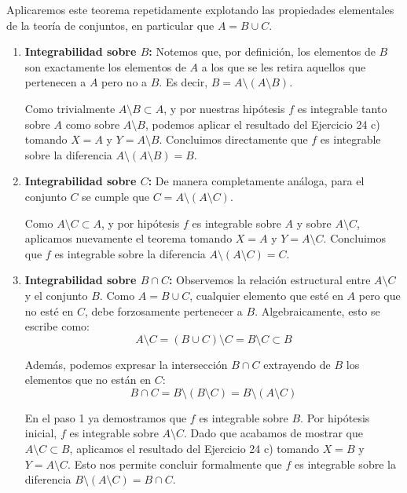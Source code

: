 \documentclass[11pt,letterpaper]{article}
\begin{document}
Aplicaremos este teorema repetidamente explotando las propiedades elementales de la teoría de conjuntos, en particular que $A = B \cup C$.

\begin{enumerate}
    \item \textbf{Integrabilidad sobre $B$:} 
    Notemos que, por definición, los elementos de $B$ son exactamente los elementos de $A$ a los que se les retira aquellos que pertenecen a $A$ pero no a $B$. Es decir, $B = A \setminus (A \setminus B)$.
    
    Como trivialmente $A \setminus B \subset A$, y por nuestras hipótesis $f$ es integrable tanto sobre $A$ como sobre $A \setminus B$, podemos aplicar el resultado del Ejercicio 24 c) tomando $X = A$ y $Y = A \setminus B$. Concluimos directamente que $f$ es integrable sobre la diferencia $A \setminus (A \setminus B) = B$.
    
    \item \textbf{Integrabilidad sobre $C$:} 
    De manera completamente análoga, para el conjunto $C$ se cumple que $C = A \setminus (A \setminus C)$.
    
    Como $A \setminus C \subset A$, y por hipótesis $f$ es integrable sobre $A$ y sobre $A \setminus C$, aplicamos nuevamente el teorema tomando $X = A$ y $Y = A \setminus C$. Concluimos que $f$ es integrable sobre la diferencia $A \setminus (A \setminus C) = C$.
    
    \item \textbf{Integrabilidad sobre $B \cap C$:} 
    Observemos la relación estructural entre $A \setminus C$ y el conjunto $B$. Como $A = B \cup C$, cualquier elemento que esté en $A$ pero que no esté en $C$, debe forzosamente pertenecer a $B$. Algebraicamente, esto se escribe como:
    \begin{equation*}
    A \setminus C = (B \cup C) \setminus C = B \setminus C \subset B
    \end{equation*}
    
    Además, podemos expresar la intersección $B \cap C$ extrayendo de $B$ los elementos que no están en $C$:
    \begin{equation*}
    B \cap C = B \setminus (B \setminus C) = B \setminus (A \setminus C)
    \end{equation*}
    
    En el paso 1 ya demostramos que $f$ es integrable sobre $B$. Por hipótesis inicial, $f$ es integrable sobre $A \setminus C$. Dado que acabamos de mostrar que $A \setminus C \subset B$, aplicamos el resultado del Ejercicio 24 c) tomando $X = B$ y $Y = A \setminus C$. Esto nos permite concluir formalmente que $f$ es integrable sobre la diferencia $B \setminus (A \setminus C) = B \cap C$.
\end{enumerate}
\end{document}
